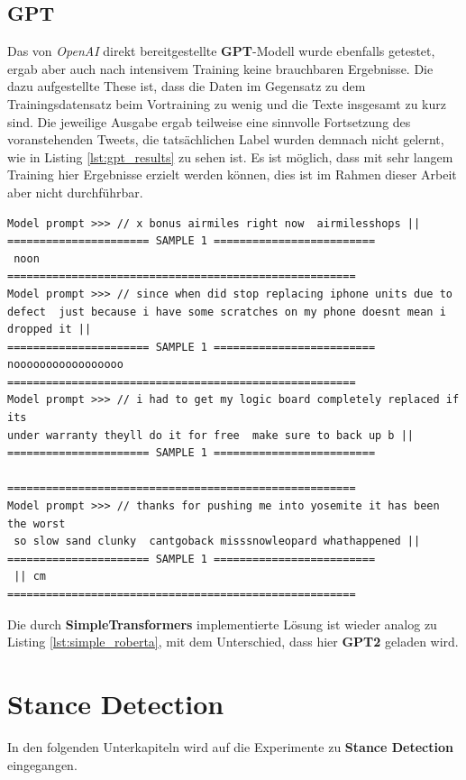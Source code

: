\subsection{GPT}
Das von \textit{OpenAI} direkt bereitgestellte \textbf{GPT}-Modell wurde ebenfalls getestet, ergab aber auch nach intensivem Training keine brauchbaren Ergebnisse. Die dazu aufgestellte These ist, dass die Daten im Gegensatz zu dem Trainingsdatensatz beim Vortraining zu wenig und die Texte insgesamt zu kurz sind. Die jeweilige Ausgabe ergab teilweise eine sinnvolle Fortsetzung des voranstehenden Tweets, die tats\"achlichen Label wurden demnach nicht gelernt, wie in Listing \ref{lst:gpt_results} zu sehen ist. Es ist m\"oglich, dass mit sehr langem Training hier Ergebnisse erzielt werden k\"onnen, dies ist im Rahmen dieser Arbeit aber nicht durchf\"uhrbar.
\lstset{language=Python}
\lstset{frame=lines}
\lstset{captionpos=b}
\lstset{basicstyle=\footnotesize}
\begin{lstlisting}
Model prompt >>> // x bonus airmiles right now  airmilesshops ||
====================== SAMPLE 1 =========================
 noon 
======================================================
Model prompt >>> // since when did stop replacing iphone units due to defect  just because i have some scratches on my phone doesnt mean i dropped it ||
====================== SAMPLE 1 =========================
nooooooooooooooooo
======================================================
Model prompt >>> // i had to get my logic board completely replaced if its 
under warranty theyll do it for free  make sure to back up b ||
====================== SAMPLE 1 =========================
  
======================================================
Model prompt >>> // thanks for pushing me into yosemite it has been the worst
 so slow sand clunky  cantgoback misssnowleopard whathappened ||
====================== SAMPLE 1 =========================
 || cm
======================================================
\end{lstlisting}
Die durch \textbf{SimpleTransformers} implementierte L\"osung ist wieder analog zu Listing \ref{lst:simple_roberta}, mit dem Unterschied, dass hier \textbf{GPT2} geladen wird.

\section{Stance Detection}
In den folgenden Unterkapiteln wird auf die Experimente zu \textbf{Stance Detection} eingegangen.

